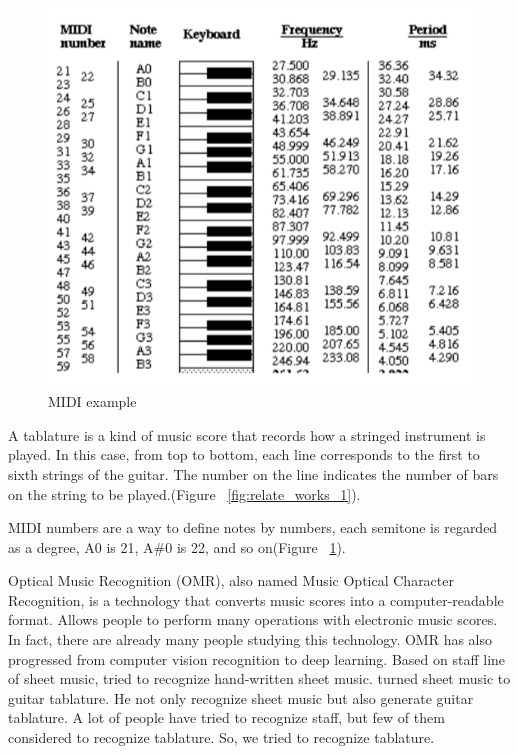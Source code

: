 \documentclass[10pt,twocolumn,letterpaper]{article}
\begin{document}
\begin{CJK}{UTF8}{bsmi}
\begin{figure}[t]
\begin{center}
   \includegraphics[width=0.8\linewidth]{relate_works_2.png}
\end{center}
   \caption{MIDI example}
\label{fig:relate_works_2}
\end{figure}

A tablature is a kind of music score that records how a stringed instrument is played. In this case, from top to bottom, each line corresponds to the first to sixth strings of the guitar. The number on the line indicates the number of bars on the string to be played.(Figure ~\ref{fig:relate_works_1}).

MIDI numbers are a way to define notes by numbers, each semitone is regarded as a degree, A0 is 21, A\#0 is 22, and so on(Figure ~\ref{fig:relate_works_2}).

Optical Music Recognition (OMR), also named Music Optical Character Recognition, is a technology that converts music scores into a computer-readable format\cite{omr_survey}. Allows people to perform many operations with electronic music scores. In fact, there are already many people studying this technology. OMR has also progressed from computer vision recognition to deep learning.
Based on staff line of sheet music, \cite{staff_detection} tried to recognize hand-written sheet music.
\cite{expert_system} turned sheet music to guitar tablature. He not only recognize sheet music but also generate guitar tablature. 
A lot of people have tried to recognize staff, but few of them considered to recognize tablature.
So, we tried to recognize tablature.



\end{CJK}
\end{document}
